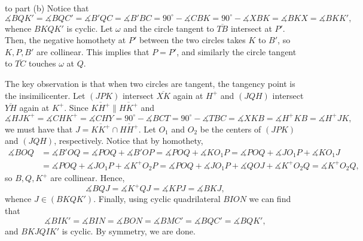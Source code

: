 \begin{customsol}{to part (b)}
    Notice that \[\measuredangle BQK'=\measuredangle BQC'=\measuredangle B'QC=\measuredangle B'BC=90^\circ-\measuredangle CBK=90^\circ-\measuredangle XBK=\measuredangle BKX=\measuredangle BKK',\]
    whence $BKQK'$ is cyclic. Let $\omega$ and the circle tangent to $\overline{TB}$ intersect at $P'$. Then, the negative homothety at $P'$ between the two circles takes $K$ to $B'$, so $K,P,B'$ are collinear. This implies that $P=P'$, and similarly the circle tangent to $\overline{TC}$ touches $\omega$ at $Q$.

    The key observation is that when two circles are tangent, the tangency point is the insimilicenter. Let $(JPK)$ intersect $\overline{XK}$ again at $H^+$ and $(JQH)$ intersect $\overline{YH}$ again at $K^+$. Since $\overline{KH^+}\parallel\overline{HK^+}$ and \[\measuredangle HJK^+=\measuredangle CHK^+=\measuredangle CHY=90^\circ-\measuredangle BCT=90^\circ-\measuredangle TBC=\measuredangle XKB=\measuredangle H^+KB=\measuredangle H^+JK,\]
    we must have that $J=\overline{KK^+}\cap\overline{HH^+}$. Let $O_1$ and $O_2$ be the centers of $(JPK)$ and $(JQH)$, respectively. Notice that by homothety,
    \begin{align*}
        \measuredangle BOQ&=\measuredangle B'OQ=\measuredangle POQ+\measuredangle B'OP=\measuredangle POQ+\measuredangle KO_1P=\measuredangle POQ+\measuredangle JO_1P+\measuredangle KO_1J\\
        &=\measuredangle POQ+\measuredangle JO_1P+\measuredangle K^+O_2P=\measuredangle POQ+\measuredangle JO_1P+\measuredangle QOJ+\measuredangle K^+O_2Q=\measuredangle K^+O_2Q,
    \end{align*}
    so $B,Q,K^+$ are collinear. Hence, \[\measuredangle BQJ=\measuredangle K^+QJ=\measuredangle KPJ=\measuredangle BKJ,\]
    whence $J\in(BKQK')$. Finally, using cyclic quadrilateral $BION$ we can find that \[\measuredangle BIK'=\measuredangle BIN=\measuredangle BON=\measuredangle BMC'=\measuredangle BQC'=\measuredangle BQK',\]
    and $BKJQIK'$ is cyclic. By symmetry, we are done.
\end{customsol}
